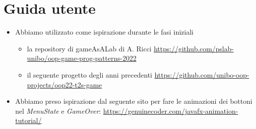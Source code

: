 \documentclass[a4paper,12pt]{report}
\begin{document}
\chapter{Guida utente}





\begin{itemize}
	\item Abbiamo utilizzato come ispirazione durante le fasi iniziali
    \begin{itemize}
        \item la repository di gameAsALab di A. Ricci \url{https://github.com/pslab-unibo/oop-game-prog-patterns-2022}
        \item il seguente progetto degli anni precedenti \url{https://github.com/unibo-oop-projects/oop22-t2s-game}
    \end{itemize}
    \item Abbiamo preso ispirazione dal seguente sito per fare le animazioni dei bottoni nel \emph{MenuState} e \emph{GameOver}: \url{https://genuinecoder.com/javafx-animation-tutorial/}
\end{itemize}
\end{document}
